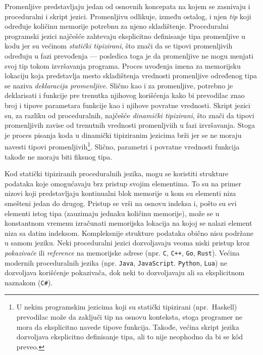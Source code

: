 Promenljive predstavljaju jedan od osnovnih koncepata na kojem se zasnivaju i proceduralni i skript jezici. Promenljivu odlikuje, između ostalog, i njen \emph{tip} koji određuje količinu memorije potrebnu za njeno skladištenje. Proceduralni programski jezici najčešće zahtevaju eksplicitno definisanje tipa promenljive u kodu jer su većinom \emph{statički tipizirani}, što znači da se tipovi promenljivih određuju u fazi prevođenja --- posledica toga je da promenljive ne mogu menjati svoj tip tokom izvršavanja programa. Proces uvođenja imena za memorijsku lokaciju koja predstavlja mesto skladištenja vrednosti promenljive određenog tipa se naziva \emph{deklaracija promenljive}. Slično kao i za promenljive, potrebno je deklarisati i funkcije pre trenutka njihovog korišćenja kako bi prevodilac znao broj i tipove parametara funkcije kao i njihove povratne vrednosti. Skript jezici su, za razliku od proceduralnih, najčešće \emph{dinamički tipizirani}, što znači da tipovi promenljivih zavise od trenutnih vrednosti promenljviih u fazi izvršavanja. Stoga je proces pisanja koda u dinamički tipiziranim jezicima brži jer se ne moraju navesti tipovi promenljivih\footnote{U nekim programskim jezicima koji su statički tipizirani (npr.~Haskell) prevodilac može da zaključi tip na osnovu konteksta, stoga programer ne mora da eksplicitno navede tipove funkcija. Takođe, većina skript jezika dozvoljava eksplicitno definisanje tipa, ali to nije neophodno da bi se k\^od preveo.}. Slično, parametri i povratne vrednosti funkcija takođe ne moraju biti fiksnog tipa.

Kod statički tipiziranih proceduralnih jezika, mogu se koristiti strukture podataka koje omogućavaju brz pristup svojim elementima. To su na primer nizovi koji predstavljaju kontinualni blok memorije u kom su elementi niza smešteni jedan do drugog. Pristup se vrši na osnovu indeksa i, pošto su svi elementi istog tipa (zauzimaju jednaku količinu memorije), može se u konstantnom vremenu izračunati memorijska lokacija na kojoj se nalazi element niza sa datim indeksom. Kompleksnije strukture podataka obično nisu podržane u samom jeziku. Neki proceduralni jezici dozvoljavaju veoma niski pristup kroz \emph{pokazivače} ili \emph{reference} na memorijske adrese (npr. \texttt{C}, \texttt{C++}, \texttt{Go}, \texttt{Rust}). Većina modernih proceduralnih jezika (npr. \texttt{Java}, \texttt{JavaScript}. \texttt{Python}, \texttt{Lua}) ne dozvoljava korišćenje pokazivača, dok neki to dozvoljavaju ali sa eksplicitnom naznakom (\texttt{C\#}).

